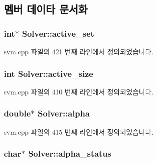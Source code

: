 \subsection{멤버 데이타 문서화}
\hypertarget{class_solver_a6382277606a9b3df3d2f0ac947e1cde3}{
\subsubsection[{active\+\_\+set}]{\setlength{\rightskip}{0pt plus 5cm}int$\ast$ Solver\+::active\+\_\+set\hspace{0.3cm}{\ttfamily [protected]}}}\label{class_solver_a6382277606a9b3df3d2f0ac947e1cde3}


svm.\+cpp 파일의 421 번째 라인에서 정의되었습니다.

\hypertarget{class_solver_a06ba1b87b3749cc545e573151b7beca0}{
\subsubsection[{active\+\_\+size}]{\setlength{\rightskip}{0pt plus 5cm}int Solver\+::active\+\_\+size\hspace{0.3cm}{\ttfamily [protected]}}}\label{class_solver_a06ba1b87b3749cc545e573151b7beca0}


svm.\+cpp 파일의 410 번째 라인에서 정의되었습니다.

\hypertarget{class_solver_a00d7a7cefa2504d41c7db6cd7cc6b428}{
\subsubsection[{alpha}]{\setlength{\rightskip}{0pt plus 5cm}double$\ast$ Solver\+::alpha\hspace{0.3cm}{\ttfamily [protected]}}}\label{class_solver_a00d7a7cefa2504d41c7db6cd7cc6b428}


svm.\+cpp 파일의 415 번째 라인에서 정의되었습니다.

\hypertarget{class_solver_a9fe653e04c43956d5fb86635651b0003}{
\subsubsection[{alpha\+\_\+status}]{\setlength{\rightskip}{0pt plus 5cm}char$\ast$ Solver\+::alpha\+\_\+status\hspace{0.3cm}{\ttfamily [protected]}}}\label{class_solver_a9fe653e04c43956d5fb86635651b0003}


